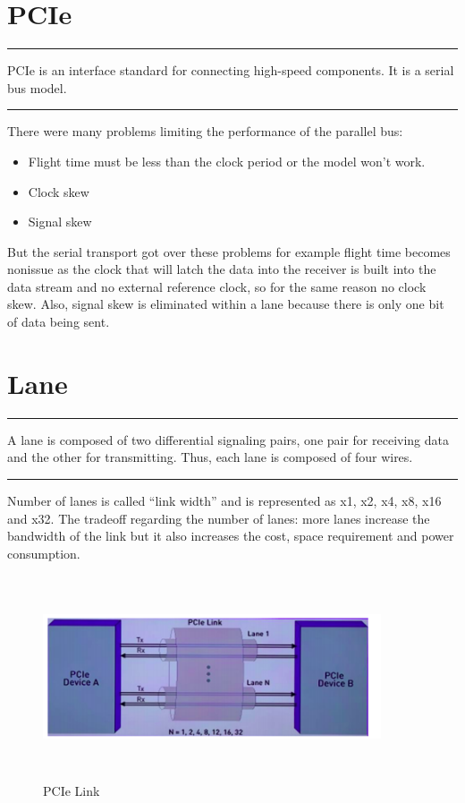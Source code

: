 \section{PCIe}
\noindent\rule{13cm}{0.4pt}
\begin{defn}
PCIe is an interface standard for connecting high-speed components. It is a serial bus
model. 
\end{defn}
\noindent\rule{13cm}{0.4pt}
There were many problems limiting the performance of the parallel bus:
\begin{itemize}
    \item  Flight time must be less than the clock period or the model won’t work.
\item  Clock skew
\item  Signal skew
\end{itemize}
But the serial transport got over these problems for example flight time becomes nonissue as the clock that will latch the data into the receiver is built into the data stream
and no external reference clock, so for the same reason no clock skew. Also, signal skew
is eliminated within a lane because there is only one bit of data being sent. 

\section{Lane}

\noindent\rule{13cm}{0.4pt}
\begin{defn}
A lane is composed of two differential signaling pairs, one pair for receiving data and the other for transmitting. Thus, each lane is composed of four wires.
\end{defn}
\noindent\rule{13cm}{0.4pt}
\newline
Number of lanes is called “link width” and is represented as x1, x2, x4, x8, x16 and x32.
The tradeoff regarding the number of lanes: more lanes increase the bandwidth of the link but it also increases the cost, space requirement and power consumption.

\begin{figure}[H]
  \centering
  \includegraphics[width=100mm,height=60mm]{images/lane.png}
  \caption{PCIe Link}
  \label{lane}
\end{figure}

